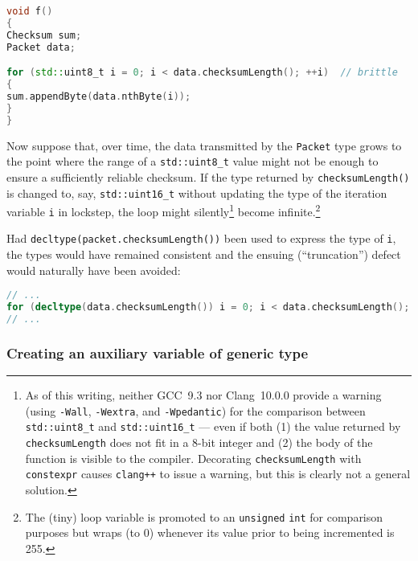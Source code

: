 \begin{lstlisting}[language=C++]
void f()
{
Checksum sum;
Packet data;

for (std::uint8_t i = 0; i < data.checksumLength(); ++i)  // brittle
{
sum.appendByte(data.nthByte(i));
}
}
\end{lstlisting}


Now suppose that, over time, the data transmitted by the \texttt{Packet}
type grows to the point where the range of a \texttt{std::uint8\_t}
value might not be enough to ensure a sufficiently reliable checksum. If
the type returned by \texttt{checksumLength()} is changed to, say,
\texttt{std::uint16\_t} without updating the type of the iteration
variable \texttt{i} in lockstep, the loop might
silently{\cprotect\footnote{As of this writing, neither
GCC~9.3 nor Clang~10.0.0 provide
a warning (using \texttt{-Wall}, \texttt{-Wextra}, and
\texttt{-Wpedantic}) for the comparison between \texttt{std::uint8\_t}
and \texttt{std::uint16\_t} --- even if both (1) the value returned by
\texttt{checksumLength} does not fit in a 8-bit integer and (2) the
body of the function is visible to the compiler. Decorating
\texttt{checksumLength} with \texttt{constexpr} causes
\texttt{clang++} to issue a warning, but this is clearly not a general
solution.}} become infinite.{\cprotect\footnote{The (tiny) loop
variable is promoted to an \texttt{unsigned} \texttt{int} for
comparison purposes but wraps (to 0) whenever its value prior to
being incremented is 255.}}

Had \texttt{decltype(packet.checksumLength())} been used to express the
type of \texttt{i}, the types would have remained consistent and the
ensuing (``truncation'') defect would naturally have been avoided:

\begin{lstlisting}[language=C++]
// ...
for (decltype(data.checksumLength()) i = 0; i < data.checksumLength(); ++i)
// ...
\end{lstlisting}


\subsubsection[Creating an auxiliary variable of generic type]{Creating an auxiliary variable of generic type}\label{creating-an-auxiliary-variable-of-generic-type}


